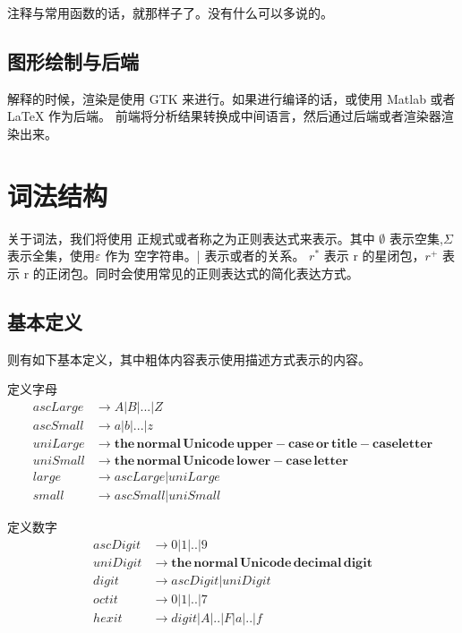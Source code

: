 \documentclass{ctexart}
\begin{document}
注释与常用函数的话，就那样子了。没有什么可以多说的。

\subsection{图形绘制与后端}
\label{sec:intro:drawNbackend}

解释的时候，渲染是使用 GTK 来进行。如果进行编译的话，或使用 Matlab 或者 LaTeX 作为后端。
前端将分析结果转换成中间语言，然后通过后端或者渲染器渲染出来。

\section{词法结构}
\label{sec:lexicalStructure}

关于词法，我们将使用 正规式或者称之为正则表达式来表示。其中 $\emptyset$ 表示空集,$\Sigma$表示全集，使用$\varepsilon$ 作为
空字符串。| 表示或者的关系。 $r^*$ 表示 r 的星闭包，$r^+$ 表示 r 的正闭包。同时会使用常见的正则表达式的简化表达方式。

\subsection{基本定义}
\label{sec:lexical:basic}

则有如下基本定义，其中粗体内容表示使用描述方式表示的内容。

定义字母
\begin{align*}
ascLarge &\rightarrow A|B|...|Z \\
ascSmall &\rightarrow a|b|...|z \\
uniLarge &\rightarrow \mathbf{the\,normal\,Unicode\,upper-case\,or\,title-case letter} \\
uniSmall &\rightarrow \mathbf{the\,normal\,Unicode\,lower-case\,letter} \\
large &\rightarrow ascLarge|uniLarge \\
small &\rightarrow ascSmall|uniSmall
\end{align*}

定义数字
\begin{align*}
ascDigit &\rightarrow 0|1|..|9 \\
uniDigit &\rightarrow \mathbf{the\,normal\,Unicode\,decimal\,digit} \\
digit &\rightarrow ascDigit|uniDigit \\
octit &\rightarrow 0|1|..|7 \\
hexit &\rightarrow digit|A|..|F|a|..|f
\end{align*}
\end{document}
